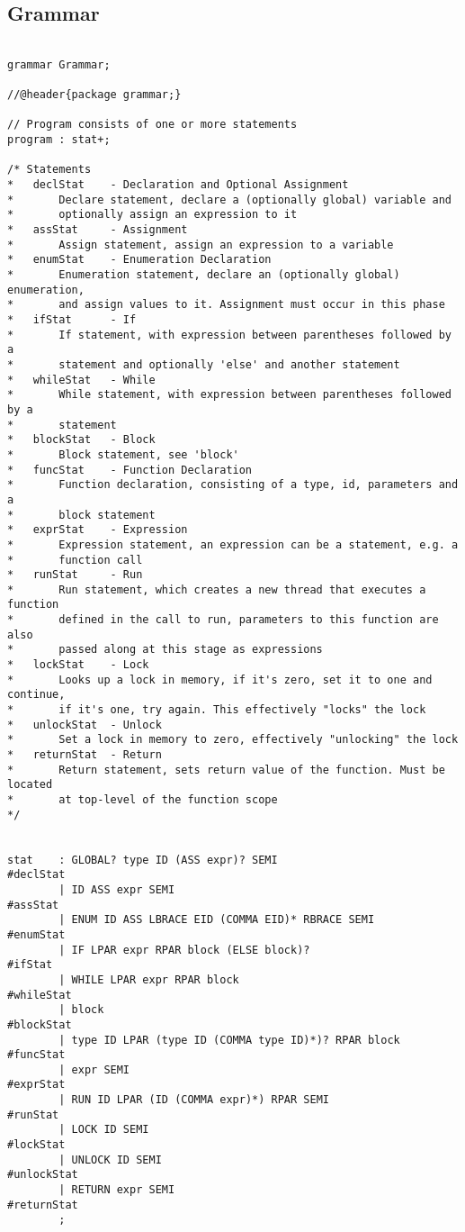 \documentclass[10pt,a4paper]{report}
\begin{document}
\begin{appendices}

\chapter{Grammar}

\begin{lstlisting}

grammar Grammar;

//@header{package grammar;}

// Program consists of one or more statements
program	: stat+;

/* Statements
* 	declStat	- Declaration and Optional Assignment
*		Declare statement, declare a (optionally global) variable and 
*		optionally assign an expression to it
*	assStat		- Assignment
*		Assign statement, assign an expression to a variable
*	enumStat	- Enumeration Declaration
*		Enumeration statement, declare an (optionally global) enumeration, 
*		and assign values to it. Assignment must occur in this phase
*	ifStat		- If
*		If statement, with expression between parentheses followed by a 
*		statement and optionally 'else' and another statement
*	whileStat	- While
*		While statement, with expression between parentheses followed by a
*		statement
*	blockStat	- Block
*		Block statement, see 'block'
*	funcStat	- Function Declaration
*		Function declaration, consisting of a type, id, parameters and a 
*		block statement
*	exprStat	- Expression
*		Expression statement, an expression can be a statement, e.g. a  
*		function call
*	runStat		- Run
*		Run statement, which creates a new thread that executes a function 
*		defined in the call to run, parameters to this function are also  
*		passed along at this stage as expressions
*	lockStat	- Lock
*		Looks up a lock in memory, if it's zero, set it to one and continue, 
*		if it's one, try again. This effectively "locks" the lock
*	unlockStat	- Unlock
*		Set a lock in memory to zero, effectively "unlocking" the lock
*	returnStat	- Return
*		Return statement, sets return value of the function. Must be located 
*		at top-level of the function scope
*/


stat	: GLOBAL? type ID (ASS expr)? SEMI						#declStat
		| ID ASS expr SEMI 										#assStat
		| ENUM ID ASS LBRACE EID (COMMA EID)* RBRACE SEMI		#enumStat
		| IF LPAR expr RPAR block (ELSE block)?					#ifStat
		| WHILE LPAR expr RPAR block 							#whileStat
		| block													#blockStat
		| type ID LPAR (type ID (COMMA type ID)*)? RPAR block	#funcStat
		| expr SEMI												#exprStat
		| RUN ID LPAR (ID (COMMA expr)*) RPAR SEMI				#runStat
		| LOCK ID SEMI											#lockStat
		| UNLOCK ID SEMI										#unlockStat
		| RETURN expr SEMI										#returnStat
		;


\end{lstlisting}
\end{appendices}
\end{document}
